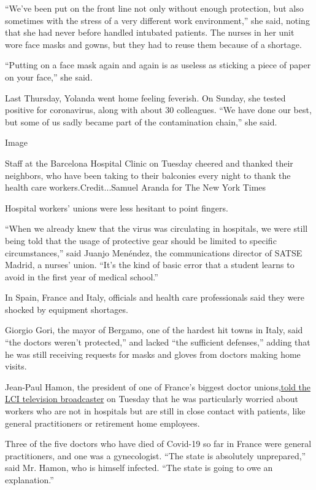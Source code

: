 ``We've been put on the front line not only without enough protection,
but also sometimes with the stress of a very different work
environment,'' she said, noting that she had never before handled
intubated patients. The nurses in her unit wore face masks and gowns,
but they had to reuse them because of a shortage.

``Putting on a face mask again and again is as useless as sticking a
piece of paper on your face,'' she said.

Last Thursday, Yolanda went home feeling feverish. On Sunday, she tested
positive for coronavirus, along with about 30 colleagues. ``We have done
our best, but some of us sadly became part of the contamination chain,''
she said.

Image

Staff at the Barcelona Hospital Clinic on Tuesday cheered and thanked
their neighbors, who have been taking to their balconies every night to
thank the health care workers.Credit...Samuel Aranda for The New York
Times

Hospital workers' unions were less hesitant to point fingers.

``When we already knew that the virus was circulating in hospitals, we
were still being told that the usage of protective gear should be
limited to specific circumstances,'' said Juanjo Menéndez, the
communications director of SATSE Madrid, a nurses' union. ``It's the
kind of basic error that a student learns to avoid in the first year of
medical school.''

In Spain, France and Italy, officials and health care professionals said
they were shocked by equipment shortages.

Giorgio Gori, the mayor of Bergamo, one of the hardest hit towns in
Italy, said ``the doctors weren't protected,'' and lacked ``the
sufficient defenses,'' adding that he was still receiving requests for
masks and gloves from doctors making home visits.

Jean-Paul Hamon, the president of one of France's biggest doctor
unions,\href{https://twitter.com/LCI/status/1242395197721501703}{told
the LCI television broadcaster} on Tuesday that he was particularly
worried about workers who are not in hospitals but are still in close
contact with patients, like general practitioners or retirement home
employees.

Three of the five doctors who have died of Covid-19 so far in France
were general practitioners, and one was a gynecologist. ``The state is
absolutely unprepared,'' said Mr. Hamon, who is himself infected. ``The
state is going to owe an explanation.''

